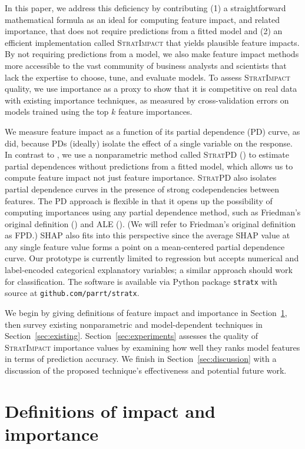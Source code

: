 \documentclass[11pt]{article}
\newcommand{\secref}[1]{Section~\ref{#1}}
\newcommand{\simp}{\fontfamily{cmr}\textsc{\small StratImpact}}
\newcommand{\spd}{\fontfamily{cmr}\textsc{\small StratPD}}
\begin{document}
In this paper, we address this deficiency by contributing (1) a straightforward mathematical formula as an ideal for computing feature impact, and related importance, that does not require predictions from a fitted model and (2) an efficient implementation called \simp{} that yields plausible feature impacts. By not requiring predictions from a model, we also make feature impact methods more accessible to the vast  community of business analysts and scientists that lack the expertise to choose, tune, and evaluate models. To assess \simp{} quality, we use importance as a proxy to show that it is competitive on real data with existing importance techniques, as measured by cross-validation errors on models trained using the top $k$ feature importances.  

We measure feature impact as a function of its partial dependence (PD) curve, as \cite{pdvim} did, because PDs (ideally) isolate the effect of a single variable on the response. In contrast to \cite{pdvim}, we use a nonparametric method called \spd{} (\citealt{stratpd}) to estimate partial dependences without predictions from a fitted model, which allows us to compute feature impact not just feature importance. \spd{} also isolates partial dependence curves in the presence of strong codependencies between features. The PD approach is flexible in that it opens up the possibility of computing importances using any partial dependence method, such as Friedman's original definition (\citealt{PDP}) and ALE (\citealt{ALE}). (We will refer to Friedman's original definition as FPD.) SHAP also fits into this perspective since the average SHAP value at any single feature value forms a point on a mean-centered partial dependence curve. Our prototype is currently limited to regression but accepts numerical and label-encoded categorical explanatory variables; a similar approach should work for classification. The software is available via Python package {\tt stratx} with source at {\tt github.com/parrt/stratx}. 

We begin by giving definitions of feature impact and importance in \secref{sec:def}, then survey existing nonparametric and model-dependent techniques in \secref{sec:existing}. \secref{sec:experiments} assesses the quality of \simp{} importance values by examining how well they ranks model features in terms of prediction accuracy. We finish in \secref{sec:discussion} with a discussion of the proposed technique's effectiveness and potential future work.

\section{Definitions of impact and importance}\label{sec:def}
\end{document}

